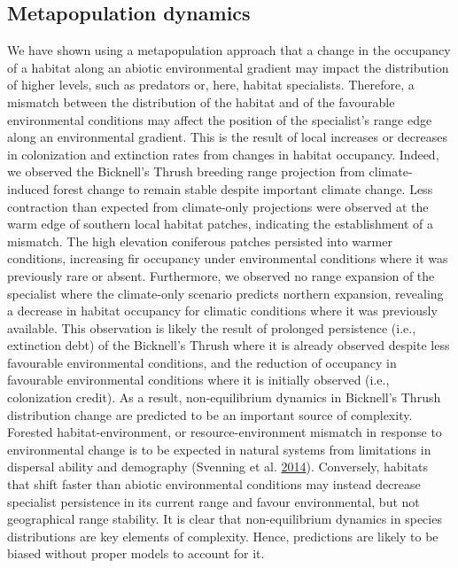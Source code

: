 \documentclass[12pt]{article}
\begin{document}
\hypertarget{metapopulation-dynamics}{%
\subsection{Metapopulation dynamics}\label{metapopulation-dynamics}}

We have shown using a metapopulation approach that a change in the
occupancy of a habitat along an abiotic environmental gradient may
impact the distribution of higher levels, such as predators or, here,
habitat specialists. Therefore, a mismatch between the distribution of
the habitat and of the favourable environmental conditions may affect
the position of the specialist's range edge along an environmental
gradient. This is the result of local increases or decreases in
colonization and extinction rates from changes in habitat occupancy.
Indeed, we observed the Bicknell's Thrush breeding range projection from
climate-induced forest change to remain stable despite important climate
change. Less contraction than expected from climate-only projections
were observed at the warm edge of southern local habitat patches,
indicating the establishment of a mismatch. The high elevation
coniferous patches persisted into warmer conditions, increasing fir
occupancy under environmental conditions where it was previously rare or
absent. Furthermore, we observed no range expansion of the specialist
where the climate-only scenario predicts northern expansion, revealing a
decrease in habitat occupancy for climatic conditions where it was
previously available. This observation is likely the result of prolonged
persistence (i.e., extinction debt) of the Bicknell's Thrush where it is
already observed despite less favourable environmental conditions, and
the reduction of occupancy in favourable environmental conditions where
it is initially observed (i.e., colonization credit). As a result,
non-equilibrium dynamics in Bicknell's Thrush distribution change are
predicted to be an important source of complexity. Forested
habitat-environment, or resource-environment mismatch in response to
environmental change is to be expected in natural systems from
limitations in dispersal ability and demography (Svenning et al.
\protect\hyperlink{ref-svenning_influence_2014}{2014}). Conversely,
habitats that shift faster than abiotic environmental conditions may
instead decrease specialist persistence in its current range and favour
environmental, but not geographical range stability. It is clear that
non-equilibrium dynamics in species distributions are key elements of
complexity. Hence, predictions are likely to be biased without proper
models to account for it.
\end{document}
